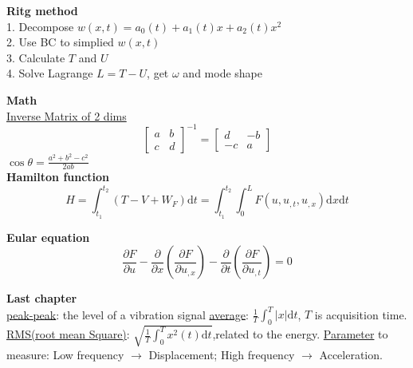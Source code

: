 \documentclass{article}
\begin{document}
\begin{multicols}{3}
  \noindent\textbf{Ritg method}\\
  1. Decompose $w(x,t) = a_0(t) + a_1(t)x + a_2(t)x^2$\\
  2. Use BC to simplied $w(x,t)$ \\
  3. Calculate $T$ and $U$\\
  4. Solve Lagrange $L = T - U$, get $\omega$ and mode shape

  \noindent\textbf{Math}\\
  \underline{Inverse Matrix of 2 dims}
  \begin{equation*}
    \begin{bmatrix}
      a & b \\
      c & d
    \end{bmatrix}^{-1} =
    \begin{bmatrix}
      d & -b \\
      -c & a
    \end{bmatrix}
  \end{equation*}
  $\cos\theta = \frac{a^2+b^2-c^2}{2ab}$\\

  \noindent\textbf{Hamilton function}
  \begin{equation*}
    H=\int_{t_{1}}^{t_{2}}(T-V+W_{F})\text{d}t
    =\int_{t_{1}}^{t_{2}}\int_{0}^{L}F(u,u_{,t},u_{,x})\text{d}x\text{d}t
  \end{equation*}

  \noindent\textbf{Eular equation}
  \begin{equation*}
    \frac{\partial F}{\partial u}-\frac{\partial}{\partial x}(\frac{\partial F}{\partial u_{,x}})-\frac{\partial}{\partial t}(\frac{\partial F}{\partial u_{,t}})=0
  \end{equation*}

  \noindent\textbf{Last chapter}\\
  \underline{peak-peak}: the level of a vibration signal
  \underline{average}: $\frac{1}{T}\int_{0}^{T}|x|\text{d}t$, $T$ is acquisition time.
  \underline{RMS(root mean Square)}: $\sqrt{\frac{1}{T}\int_{0}^{T}x^{2}(t)\text{d}t}$,related  to the energy.
  \underline{Parameter} to measure: Low frequency $\rightarrow$ Displacement; High frequency $\rightarrow$ Acceleration.


\end{multicols}
\end{document}

